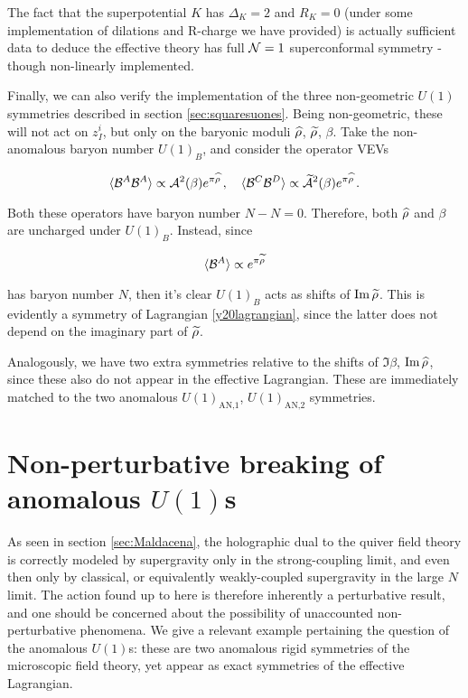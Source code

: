 The fact that the superpotential $K$ has $\Delta_K = 2$ and $R_K = 0$ (under some implementation of dilations and R-charge we have provided) is actually sufficient data \cite{terningmodernsusy} to deduce the effective theory has full $\mathcal{N} = 1$ superconformal symmetry - though non-linearly implemented.

Finally, we can also verify the implementation of the three non-geometric $U(1)$ symmetries described in section \ref{sec:squaresuones}. Being non-geometric, these will not act on $z_I^i$, but only on the baryonic moduli $\widehat{\rho}$, $\widetilde{\rho}$, $\beta$. Take the non-anomalous baryon number $U(1)_B$, and consider the operator VEVs

\begin{equation}
	\langle\mathcal{B}^A \mathcal{B}^A\rangle \propto \mathcal{A}^2(\beta) e^{\pi\widehat{\rho}}\,,\quad 
	\langle{\ensuremath{\mathcal{B}}^C\ensuremath{\mathcal{B}}^D}\rangle \propto \widetilde{\mathcal{A}}^2(\beta) e^{\pi\widehat{\rho}}\,.
	\label{}
\end{equation}

Both these operators have baryon number $N-N=0$. Therefore, both $\widehat{\rho}$ and $\beta$ are uncharged under $U(1)_B$. Instead, since

\begin{equation}
	\langle \mathcal{B}^A \rangle \propto e^{\pi\widetilde{\rho}}
	\label{}
\end{equation}

has baryon number $N$, then it's clear $U(1)_B$ acts as shifts of $\operatorname{Im} \widetilde{\rho}$. This is evidently a symmetry of Lagrangian \eqref{y20lagrangian}, since the latter does not depend on the imaginary part of $\widetilde{\rho}$.

Analogously, we have two extra symmetries relative to the shifts of $\Im \beta$, $\operatorname{Im} \widehat{\rho}$, since these also do not appear in the effective Lagrangian. These are immediately matched to the two anomalous $U(1)_\text{AN,1}$, $U(1)_\text{AN,2}$ symmetries.

\section{Non-perturbative breaking of anomalous $U(1)$s}\label{sec:ebranes}

As seen in section \ref{sec:Maldacena}, the holographic dual to the quiver field theory is correctly modeled by supergravity only in the strong-coupling limit, and even then only by classical, or equivalently weakly-coupled supergravity in the large $N$ limit. The action found up to here is therefore inherently a perturbative result, and one should be concerned about the possibility of unaccounted non-perturbative phenomena. We give a relevant example pertaining the question of the anomalous $U(1)$s: these are two anomalous rigid symmetries of the microscopic field theory, yet appear as exact symmetries of the effective Lagrangian.

